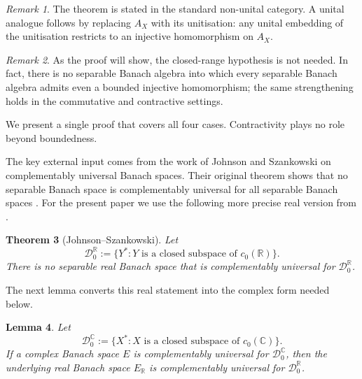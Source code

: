 \documentclass[11pt]{amsart}
\newcommand{\C}{\mathbb{C}}
\newcommand{\R}{\mathbb{R}}
\theoremstyle{plain}
\newtheorem{theorem}{Theorem}[section]
\newtheorem{lemma}[theorem]{Lemma}
\theoremstyle{remark}
\newtheorem{remark}[theorem]{Remark}
\numberwithin{equation}{section}
\begin{document}
\begin{remark}\label{rem:unital}
The theorem is stated in the standard non-unital category. A unital analogue follows by replacing $A_X$ with its unitisation: any unital embedding of the unitisation restricts to an injective homomorphism on $A_X$.
\end{remark}

\begin{remark}\label{rem:stronger}
As the proof will show, the closed-range hypothesis is not needed. In fact, there is no separable Banach algebra into which every separable Banach algebra admits even a bounded injective homomorphism; the same strengthening holds in the commutative and contractive settings.
\end{remark}

We present a single proof that covers all four cases. Contractivity plays no role beyond boundedness.

The key external input comes from the work of Johnson and Szankowski on complementably universal Banach spaces. Their original theorem shows that no separable Banach space is complementably universal for all separable Banach spaces \cite{JS1976}. For the present paper we use the following more precise real version from \cite[Theorem~2.3]{JS2009}.

\begin{theorem}[Johnson--Szankowski]\label{thm:JS}
Let
\[
\mathcal D_0^{\R}:=\{Y^*: Y\text{ is a closed subspace of }c_0(\R)\}.
\]
There is no separable real Banach space that is complementably universal for $\mathcal D_0^{\R}$.
\end{theorem}

The next lemma converts this real statement into the complex form needed below.

\begin{lemma}\label{lem:complex-reduction}
Let
\[
\mathcal D_0^{\C}:=\{X^*: X\text{ is a closed subspace of }c_0(\C)\}.
\]
If a complex Banach space $E$ is complementably universal for $\mathcal D_0^{\C}$, then the underlying real Banach space $E_{\R}$ is complementably universal for $\mathcal D_0^{\R}$.
\end{lemma}
\end{document}
